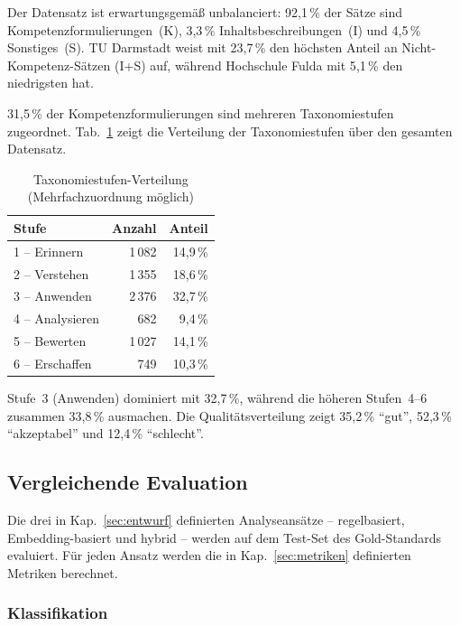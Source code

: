 Der Datensatz ist erwartungsgemäß unbalanciert: 92{,}1\,\% der Sätze sind Kompetenzformulierungen~(K), 3{,}3\,\% Inhaltsbeschreibungen~(I) und 4{,}5\,\% Sonstiges~(S).
TU Darmstadt weist mit 23{,}7\,\% den höchsten Anteil an Nicht-Kompetenz-Sätzen (I+S) auf, während Hochschule Fulda mit 5{,}1\,\% den niedrigsten hat.

31{,}5\,\% der Kompetenzformulierungen sind mehreren Taxonomiestufen zugeordnet.
Tab.~\ref{tab:taxonomie-verteilung} zeigt die Verteilung der Taxonomiestufen über den gesamten Datensatz.

\begin{table}[H]
\caption{Taxonomiestufen-Verteilung (Mehrfachzuordnung möglich)\label{tab:taxonomie-verteilung}}
\centering
\begin{tabular}{lrr}
\hline
\textbf{Stufe} & \textbf{Anzahl} & \textbf{Anteil} \\
\hline
1 -- Erinnern & 1\,082 & 14{,}9\,\% \\
2 -- Verstehen & 1\,355 & 18{,}6\,\% \\
3 -- Anwenden & 2\,376 & 32{,}7\,\% \\
4 -- Analysieren & 682 & 9{,}4\,\% \\
5 -- Bewerten & 1\,027 & 14{,}1\,\% \\
6 -- Erschaffen & 749 & 10{,}3\,\% \\
\hline
\end{tabular}
\end{table}

Stufe~3 (Anwenden) dominiert mit 32{,}7\,\%, während die höheren Stufen~4--6 zusammen 33{,}8\,\% ausmachen.
Die Qualitätsverteilung zeigt 35{,}2\,\% \enquote{gut}, 52{,}3\,\% \enquote{akzeptabel} und 12{,}4\,\% \enquote{schlecht}.

\subsection{Vergleichende Evaluation}\label{sec:eval-vergleich}

Die drei in Kap.~\ref{sec:entwurf} definierten Analyseansätze -- regelbasiert, Embedding-basiert und hybrid -- werden auf dem Test-Set des Gold-Standards evaluiert.
Für jeden Ansatz werden die in Kap.~\ref{sec:metriken} definierten Metriken berechnet.

\subsubsection{Klassifikation}\label{sec:eval-klassifikation}

